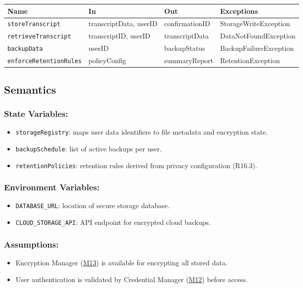 \documentclass[12pt, titlepage]{article}
\begin{document}
\begin{tabular}{|l|l|l|l|}
\hline
\textbf{Name} & \textbf{In} & \textbf{Out} & \textbf{Exceptions} \\ \hline
\texttt{storeTranscript} & transcriptData, userID & confirmationID & StorageWriteException \\ 
\texttt{retrieveTranscript} & transcriptID, userID & transcriptData & DataNotFoundException \\ 
\texttt{backupData} & userID & backupStatus & BackupFailureException \\ 
\texttt{enforceRetentionRules} & policyConfig & summaryReport & RetentionException \\ \hline
\end{tabular}

\subsection{Semantics}
\subsubsection{State Variables:}
\begin{itemize}
  \item \texttt{storageRegistry}: maps user data identifiers to file metadata and encryption state.
  \item \texttt{backupSchedule}: list of active backups per user.
  \item \texttt{retentionPolicies}: retention rules derived from privacy configuration (R16.3).
\end{itemize}

\subsubsection{Environment Variables:}
\begin{itemize}
  \item \texttt{DATABASE\_URL}: location of secure storage database.
  \item \texttt{CLOUD\_STORAGE\_API}: API endpoint for encrypted cloud backups.
\end{itemize}

\subsubsection{Assumptions:}
\begin{itemize}
  \item Encryption Manager (\hyperref[M13]{M13}) is available for encrypting all stored data.
  \item User authentication is validated by Credential Manager (\hyperref[M12]{M12}) before access.
\end{itemize}
\end{document}
